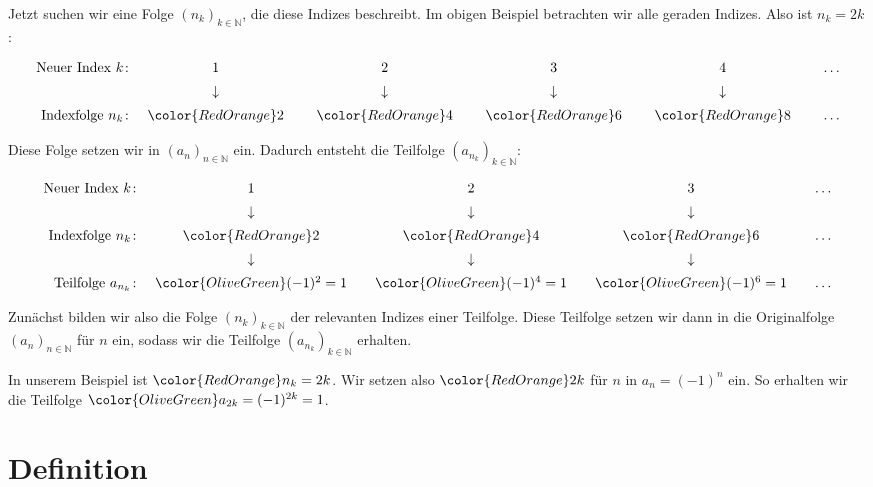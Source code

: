 \documentclass[fontsize=9pt,
               parskip=half-,
               DIV=14,
               listof=chapterentry,
               tocflat]{scrbook}
\begin{document}
Jetzt suchen wir eine Folge $\left(n_{k}\right)_{k\in \mathbb {N} }$, die diese Indizes beschreibt. Im obigen Beispiel betrachten wir alle geraden Indizes. Also ist $n_{k}=2k$:

\begin{align*}
{\begin{array}{rccccccccccccc}{\text{Neuer Index }}k\colon &1&\ &2&\ &3&\ &4&\ &\ldots \\[0.5em]&\downarrow &&\downarrow &&\downarrow &&\downarrow &&\\[0.5em]{\text{Indexfolge }}n_{k}\colon &{\color {RedOrange}2}&\ &{\color {RedOrange}4}&\ &{\color {RedOrange}6}&\ &{\color {RedOrange}8}&\ &\ldots \end{array}}
\end{align*}

Diese Folge setzen wir in $\left(a_{n}\right)_{n\in \mathbb {N} }$ ein. Dadurch entsteht die Teilfolge $\left(a_{n_{k}}\right)_{k\in \mathbb {N} }$:

\begin{align*}
{\begin{array}{rccccccccccccc}{\text{Neuer Index }}k\colon &1&&2&&3&&\ldots \\[0.5em]&\downarrow &&\downarrow &&\downarrow &&\\[0.5em]{\text{Indexfolge }}n_{k}\colon &{\color {RedOrange}2}&&{\color {RedOrange}4}&&{\color {RedOrange}6}&&\ldots \\[0.5em]&\downarrow &&\downarrow &&\downarrow &&\\[0.5em]{\text{Teilfolge }}a_{n_{k}}\colon &{\color {OliveGreen}(-1)^{2}=1}&&{\color {OliveGreen}(-1)^{4}=1}&&{\color {OliveGreen}(-1)^{6}=1}&&\ldots \end{array}}
\end{align*}

Zunächst bilden wir also die Folge $\left(n_{k}\right)_{k\in \mathbb {N} }$ der relevanten Indizes einer Teilfolge. Diese Teilfolge setzen wir dann in die Originalfolge $\left(a_{n}\right)_{n\in \mathbb {N} }$ für $n$ ein, sodass wir die Teilfolge $\left(a_{n_{k}}\right)_{k\in \mathbb {N} }$ erhalten.

In unserem Beispiel ist ${\color {RedOrange}n_{k}=2k}$. Wir setzen also ${\color {RedOrange}2k}$ für $n$ in $a_{n}=(-1)^{n}$ ein. So erhalten wir die Teilfolge ${\color {OliveGreen}a_{2k}=(-1)^{2k}=1}$.

\section{Definition}
\end{document}
